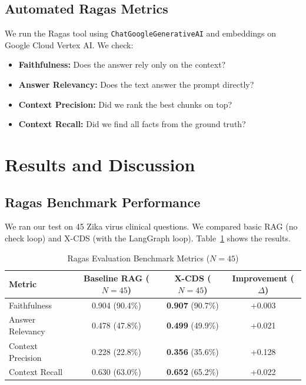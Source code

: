 \documentclass[pdflatex,sn-mathphys-num]{sn-jnl}%
\theoremstyle{thmstyleone}%
\theoremstyle{thmstyletwo}%
\theoremstyle{thmstylethree}%
\begin{document}
\subsection{Automated Ragas Metrics}
We run the Ragas tool using \texttt{ChatGoogleGenerativeAI} and embeddings on Google Cloud Vertex AI. We check:
\begin{itemize}
    \item \textbf{Faithfulness:} Does the answer rely only on the context?
    \item \textbf{Answer Relevancy:} Does the text answer the prompt directly?
    \item \textbf{Context Precision:} Did we rank the best chunks on top?
    \item \textbf{Context Recall:} Did we find all facts from the ground truth?
\end{itemize}

\section{Results and Discussion}\label{sec:results}

\subsection{Ragas Benchmark Performance}
We ran our test on 45 Zika virus clinical questions. We compared basic RAG (no check loop) and X-CDS (with the LangGraph loop). Table~\ref{tab:metrics} shows the results.

\begin{table}[htbp]
\caption{Ragas Evaluation Benchmark Metrics ($N=45$)}
\label{tab:metrics}
\centering
\begin{tabular}{lccc}
\hline
\textbf{Metric} & \textbf{Baseline RAG ($N=45$)} & \textbf{X-CDS ($N=45$)} & \textbf{Improvement ($\Delta$)} \\ \hline
Faithfulness & 0.904 (90.4\%) & \textbf{0.907} (90.7\%) & +0.003 \\ 
Answer Relevancy & 0.478 (47.8\%) & \textbf{0.499} (49.9\%) & +0.021 \\ 
Context Precision & 0.228 (22.8\%) & \textbf{0.356} (35.6\%) & +0.128 \\ 
Context Recall & 0.630 (63.0\%) & \textbf{0.652} (65.2\%) & +0.022 \\ \hline
\end{tabular}
\end{table}
\end{document}
